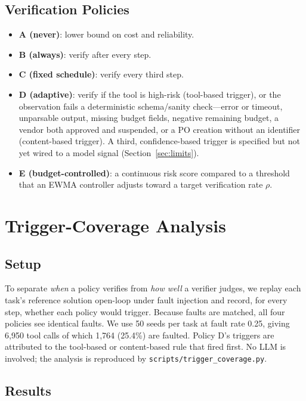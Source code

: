 \documentclass[conference]{IEEEtran}
\begin{document}
\subsection{Verification Policies}
\begin{itemize}
\item \textbf{A (never)}: lower bound on cost and reliability.
\item \textbf{B (always)}: verify after every step.
\item \textbf{C (fixed schedule)}: verify every third step.
\item \textbf{D (adaptive)}: verify if the tool is high-risk (tool-based trigger), or the
observation fails a deterministic schema/sanity check---error or timeout, unparsable output,
missing budget fields, negative remaining budget, a vendor both approved and suspended, or a
PO creation without an identifier (content-based trigger). A third, confidence-based trigger
is specified but not yet wired to a model signal (Section~\ref{sec:limits}).
\item \textbf{E (budget-controlled)}: a continuous risk score compared to a threshold that an
EWMA controller adjusts toward a target verification rate $\rho$.
\end{itemize}

\section{Trigger-Coverage Analysis}
\label{sec:coverage}

\subsection{Setup}
To separate \emph{when} a policy verifies from \emph{how well} a verifier judges, we replay
each task's reference solution open-loop under fault injection and record, for every step,
whether each policy would trigger. Because faults are matched, all four policies see
identical faults. We use 50 seeds per task at fault rate 0.25, giving 6{,}950 tool calls of
which 1{,}764 (25.4\%) are faulted. Policy D's triggers are attributed to the tool-based or
content-based rule that fired first. No LLM is involved; the analysis is reproduced by
\texttt{scripts/trigger\_coverage.py}.

\subsection{Results}
\end{document}
